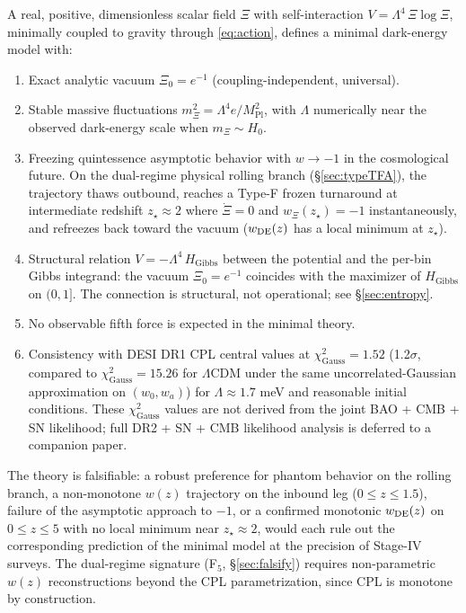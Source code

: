 \documentclass[11pt,reqno]{amsart}
\theoremstyle{plain}
\theoremstyle{definition}
\theoremstyle{remark}
\newcommand{\Pl}{\mathrm{Pl}}
\newcommand{\Gibbs}{\mathrm{Gibbs}}
\begin{document}
A real, positive, dimensionless scalar field $\Xi$ with self-interaction
$V = \Lambda^{4}\,\Xi\log\Xi$, minimally coupled to gravity through
\eqref{eq:action}, defines a minimal dark-energy model with:
\begin{enumerate}
  \item Exact analytic vacuum $\Xi_0 = e^{-1}$
        (coupling-independent, universal).
  \item Stable massive fluctuations $m_\Xi^{2} = \Lambda^{4} e / M_\Pl^{2}$,
        with $\Lambda$ numerically near the observed dark-energy scale
        when $m_\Xi \sim H_0$.
  \item Freezing quintessence asymptotic behavior with $w \to -1$ in
        the cosmological future. On the dual-regime physical rolling
        branch (\S\ref{sec:typeTFA}), the trajectory thaws outbound,
        reaches a Type-F frozen turnaround at intermediate redshift
        $z_\star \approx 2$ where $\dot\Xi = 0$ and $w_\Xi(z_\star) = -1$
        instantaneously, and refreezes back toward the vacuum
        ($w_{\rm DE}(z)$ has a local minimum at $z_\star$).
  \item Structural relation $V = -\Lambda^{4}\,H_{\Gibbs}$ between the
        potential and the per-bin Gibbs integrand: the vacuum
        $\Xi_0 = e^{-1}$ coincides with the maximizer of $H_{\Gibbs}$
        on $(0,1]$. The connection is structural, not operational; see
        \S\ref{sec:entropy}.
  \item No observable fifth force is expected in the minimal theory.
  \item Consistency with DESI DR1 CPL central values at
        $\chi^{2}_{\text{Gauss}} = 1.52$ (1.2$\sigma$, compared to
        $\chi^{2}_{\text{Gauss}} = 15.26$ for $\Lambda$CDM under the
        same uncorrelated-Gaussian approximation on $(w_0,w_a)$) for
        $\Lambda \approx 1.7$ meV and reasonable initial conditions.
        These $\chi^{2}_{\text{Gauss}}$ values are not derived from the
        joint BAO + CMB + SN likelihood; full DR2 + SN + CMB likelihood
        analysis is deferred to a companion paper.
\end{enumerate}
The theory is falsifiable: a robust preference for phantom behavior on
the rolling branch, a non-monotone $w(z)$ trajectory on the inbound leg
($0 \leq z \leq 1.5$), failure of the asymptotic approach to $-1$, or
a confirmed monotonic $w_{\rm DE}(z)$ on $0 \leq z \leq 5$ with no local
minimum near $z_\star \approx 2$, would each rule out the corresponding
prediction of the minimal model at the precision of Stage-IV surveys.
The dual-regime signature (F$_5$, \S\ref{sec:falsify}) requires
non-parametric $w(z)$ reconstructions beyond the CPL parametrization,
since CPL is monotone by construction.
\end{document}
